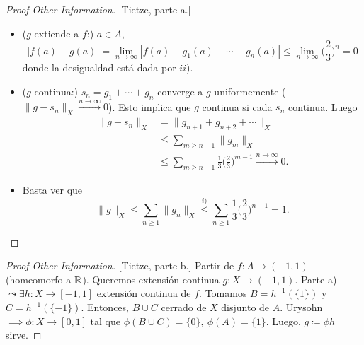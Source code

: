 \begin{proof}[Proof Other Information][Tietze, parte a.]
\begin{itemize}
		\item ($g$ extiende a $f$:) $a \in A$,
		\[ | f(a) - g(a) | = \lim_{n \to \infty} | f(a) - g_{1}(a) - \cdots - g_{n}(a) | \leq \lim_{n \to \infty} \Big(\frac{2}{3}\Big)^{n} = 0 \]
		donde la desigualdad está dada por $ii)$.

		\item ($g$ continua:) $s_{n} = g_{1} + \cdots + g_{n}$ converge a $g$ uniformemente ($\| g - s_{n} \|_{X} \stackrel{n \to \infty}{\longrightarrow} 0$). Esto implica que $g$ continua si cada $s_{n}$ continua. Luego
		\begin{align*}
			\| g - s_{n} \|_{X} &= \| g_{n+1} + g_{n+2} + \cdots \|_{X} \\
			&\leq \sum_{m \geq n+1}^{} \| g_{m} \|_{X} \\
			&\leq \sum_{m \geq n+1}^{} \frac{1}{3} \Big(\frac{2}{3}\Big)^{m-1} \stackrel{n \to \infty}{\longrightarrow} 0
		.\end{align*}
		
		\item Basta ver que
		\[ \| g \|_{X} \leq \sum_{n \geq 1}^{} \| g_{n} \|_{X} \stackrel{i)}{\leq} \sum_{n \geq 1}^{} \frac{1}{3} \Big(\frac{2}{3}\Big)^{n-1} = 1. \]
	\end{itemize}
\end{proof}

\begin{proof}[Proof Other Information][Tietze, parte b.]
	Partir de $f : A \to (-1,1)$ (homeomorfo a $\mathbb{R}$). Queremos extensión continua $g : X \to (-1,1)$. Parte a) $\leadsto \exists h : X \to [-1,1]$ extensión continua de $f$. Tomamos $B = h^{-1}( \{1\} )$ y $C = h^{-1}( \{-1\} )$. Entonces, $B \cup C$ cerrado de $X$ disjunto de $A$. Urysohn $\implies \phi : X \to [0,1]$ tal que $\phi(B \cup C) = \{0\},\ \phi(A) = \{1\}$. Luego, $g \coloneq \phi h$ sirve.
\end{proof}
